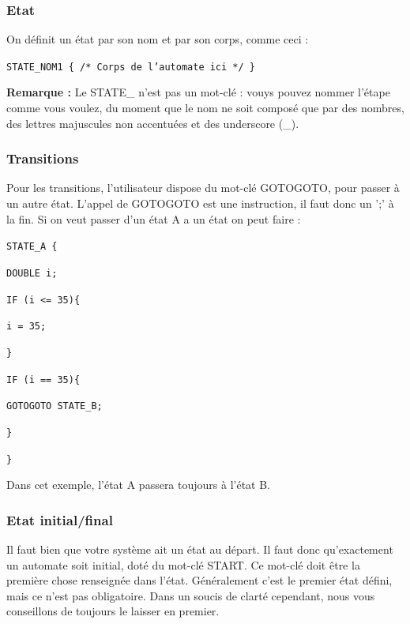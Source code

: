\documentclass[a4paper,11pt]{article}
\begin{document}
        \subsubsection{Etat}
            On définit un état par son nom et par son corps, comme ceci :

            \texttt{STATE\_NOM1 \{
                /* Corps de l'automate ici */
            \}}

            \textbf{Remarque :} Le STATE\_ n'est pas un mot-clé : vouys pouvez nommer l'étape comme vous voulez, du moment que le nom ne soit composé que par des nombres, des lettres majuscules non accentuées et des underscore (\_).

        \subsubsection{Transitions}
            Pour les transitions, l'utilisateur dispose du mot-clé GOTOGOTO, pour passer à un autre état. L'appel de GOTOGOTO est une instruction, il faut donc un ';' à la fin. 
            Si on veut passer d'un état A a un état on peut faire : 
            \newline

            \texttt{STATE\_A \{}

            \texttt{\quad DOUBLE i;}
                        
            \texttt{\quad	IF (i <= 35)\{}
                
            \texttt{\qquad i = 35;}
                        
            \texttt{\quad \}}
                
            \texttt{\quad IF (i == 35)\{}
                
            \texttt{\qquad GOTOGOTO STATE\_B; }
                    
            \texttt{\quad \}}
                
            \texttt{\}}

            Dans cet exemple, l'état A passera toujours à l'état B.

        \subsubsection{Etat initial/final}

            Il faut bien que votre système ait un état au départ. Il faut donc qu'exactement un automate soit initial, doté du mot-clé START. Ce mot-clé doit être la première chose renseignée dans l'état.  
            Généralement c'est le premier état défini, mais ce n'est pas obligatoire. Dans un soucis de clarté cependant, nous vous conseillons de toujours le laisser en premier.
\end{document}
